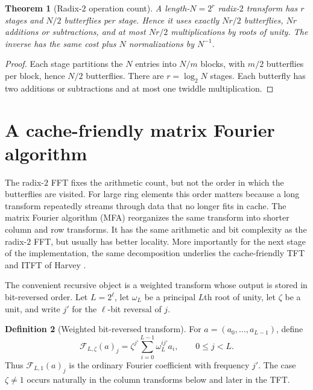 \documentclass[11pt]{book}
\newtheorem{theorem}{Theorem}[section]
\theoremstyle{definition}
\newtheorem{definition}[theorem]{Definition}
\begin{document}
\begin{theorem}[Radix-$2$ operation count]\label{thm:fft-operation-count}
A length-$N=2^r$ radix-$2$ transform has $r$ stages and $N/2$ butterflies per
stage.  Hence it uses exactly $Nr/2$ butterflies, $Nr$ additions or
subtractions, and at most $Nr/2$ multiplications by roots of unity.  The
inverse has the same cost plus $N$ normalizations by $N^{-1}$.
\end{theorem}

\begin{proof}
Each stage partitions the $N$ entries into $N/m$ blocks, with $m/2$
butterflies per block, hence $N/2$ butterflies.  There are $r=\log_2N$
stages.  Each butterfly has two additions or subtractions and at most one
twiddle multiplication.
\end{proof}

\section{A cache-friendly matrix Fourier algorithm}
\label{sec:mfa}

The radix-$2$ FFT fixes the arithmetic count, but not the order in which the
butterflies are visited.  For large ring elements this order matters because a
long transform repeatedly streams through data that no longer fits in cache.
The matrix Fourier algorithm (MFA) reorganizes the same transform into shorter
column and row transforms.  It has the same arithmetic and bit complexity as
the radix-$2$ FFT, but usually has better locality.  More importantly for the
next stage of the implementation, the same decomposition underlies the
cache-friendly TFT and ITFT of Harvey \cite{Harvey2008CacheTFT}.

The convenient recursive object is a weighted transform whose output is stored
in bit-reversed order.  Let $L=2^\ell$, let $\omega_L$ be a principal $L$th
root of unity, let $\zeta$ be a unit, and write $j'$ for the $\ell$-bit
reversal of $j$.

\begin{definition}[Weighted bit-reversed transform]\label{def:weighted-dft}
For $a=(a_0,\ldots,a_{L-1})$, define
\begin{equation}\label{eq:weighted-dft}
 \mathcal F_{L,\zeta}(a)_j
 =\zeta^{j'}\sum_{i=0}^{L-1}\omega_L^{ij'}a_i,
 \qquad 0\leq j<L.
\end{equation}
Thus $\mathcal F_{L,1}(a)_j$ is the ordinary Fourier coefficient with
frequency $j'$.  The case $\zeta\ne1$ occurs naturally in the column
transforms below and later in the TFT.
\end{definition}
\end{document}
